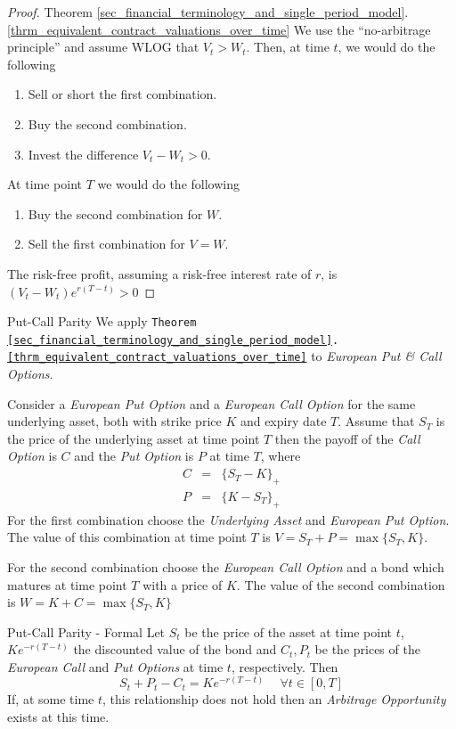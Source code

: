 \documentclass[11pt,a4paper]{article}
\begin{document}
  \begin{proof}{Theorem \ref{sec_financial_terminology_and_single_period_model}.\ref{thrm_equivalent_contract_valuations_over_time}}
    We use the ``no-arbitrage principle'' and assume WLOG that $V_t>W_t$. Then, at time $t$, we would do the following
    \begin{enumerate}
      \item Sell or short the first combination.
      \item Buy the second combination.
      \item Invest the difference $V_t-W_t>0$.
    \end{enumerate}
    At time point $T$ we would do the following
    \begin{enumerate}
      \item Buy the second combination for $W$.
      \item Sell the first combination for $V=W$.
    \end{enumerate}
    The risk-free profit, assuming a risk-free interest rate of $r$, is $(V_t-W_t)e^{r(T-t)}>0$
  \end{proof}

  \begin{proposition}{Put-Call Parity}
    We apply \texttt{Theorem \ref{sec_financial_terminology_and_single_period_model}.\ref{thrm_equivalent_contract_valuations_over_time}} to \textit{European Put \& Call Options}.
    \par Consider a \textit{European Put Option} and a \textit{European Call Option} for the same underlying asset, both with strike price $K$ and expiry date $T$. Assume that $S_T$ is the price of the underlying asset at time point $T$ then the payoff of the \textit{Call Option} is $C$ and the \textit{Put Option} is $P$ at time $T$, where
    \[\begin{array}{rcl}
      C&=&\{S_T-K\}_+\\
      P&=&\{K-S_T\}_+
    \end{array}\]
    For the first combination choose the \textit{Underlying Asset} and \textit{European Put Option}. The value of this combination at time point $T$ is $V=S_T+P=\max\{S_T,K\}$.
    \par For the second combination choose the \textit{European Call Option} and a bond which matures at time point $T$ with a price of $K$. The value of the second combination is $W=K+C=\max\{S_T,K\}$
  \end{proposition}

  \begin{theorem}{Put-Call Parity - Formal}
    Let $S_t$ be the price of the asset at time point $t$, $Ke^{-r(T-t)}$ the discounted value of the bond and $C_t,P_t$ be the prices of the \textit{European Call} and \textit{Put Options} at time $t$, respectively. Then
    \[ S_t+P_t-C_t=Ke^{-r(T-t)}\quad\ \forall t\in[0,T] \]
    If, at some time $t$, this relationship does not hold then an \textit{Arbitrage Opportunity} exists at this time.
  \end{theorem}
\end{document}

